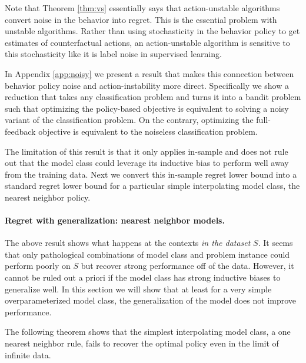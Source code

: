 Note that Theorem \ref{thm:vs} essentially says that action-unstable algorithms convert noise in the behavior into regret. This is the essential problem with unstable algorithms. Rather than using stochasticity in the behavior policy to get estimates of counterfactual actions, an action-unstable algorithm is sensitive to this stochasticity like it is label noise in supervised learning.

In Appendix \ref{app:noisy} we present a result that makes this connection between behavior policy noise and action-instability more direct. Specifically we show a reduction that takes any classification problem and turns it into a bandit problem such that optimizing the policy-based objective is equivalent to solving a noisy variant of the classification problem. On the contrary, optimizing the full-feedback objective is equivalent to the noiseless classification problem.

The limitation of this result is that it only applies in-sample and does not rule out that the model class could leverage its inductive bias to perform well away from the training data.
Next we convert this in-sample regret lower bound into a standard regret lower bound for a particular simple interpolating model class, the nearest neighbor policy.



\paragraph{Regret with generalization: nearest neighbor models.}

The above result shows what happens at the contexts \emph{in the dataset} $ S$. It seems that only pathological combinations of model class and problem instance could perform poorly on $ S$ but recover strong performance off of the data. However, it cannot be ruled out a priori if the model class has strong inductive biases to generalize well. In this section we will show that at least for a very simple overparameterized model class, the generalization of the model does not improve performance.

The following theorem shows that the simplest interpolating model class, a one nearest neighbor rule, fails to recover the optimal policy even in the limit of infinite data.




